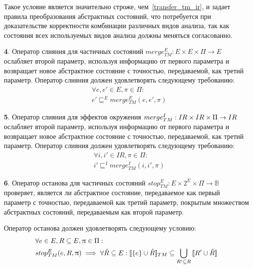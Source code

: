 Такое условие является значительно строже, чем~\ref{transfer_tm_ir}, и задает правила преобразования абстрактных состояний, что потребуется при доказательстве корректности комбинации различных видов анализа, так как состояния всех используемых видов анализа должны меняться согласованно.

{\textbf 4.}
Оператор слияния для частичных состояний $merge^E_{TM}: E \times E \times \Pi \rightarrow E$ ослабляет второй параметр, используя информацию от первого параметра и возвращает новое абстрактное состояние с точностью, передаваемой, как третий параметр.
Оператор слияния должен удовлетворять следующему требованию:
\begin{equation}
\label{cpa_merge_tm_e_eq}
\begin{aligned}
&\forall e, e' \in E, \pi \in \Pi :\\
&e' \sqsubseteq^E merge^E_{TM}(e, e', \pi)
\end{aligned}
\end{equation}

{\textbf 5.}
Оператор слияния для эффектов окружения $merge^I_{TM}: IR \times IR \times \Pi \rightarrow IR$ ослабляет второй параметр, используя информацию от первого параметра и возвращает новое абстрактное состояние с точностью, передаваемой, как третий параметр.
Оператор слияния должен удовлетворять следующему требованию:
\begin{equation}
\label{cpa_merge_tm_i_eq}
\begin{aligned}
&\forall i, i' \in IR, \pi \in \Pi :\\
&i' \sqsubseteq^I merge^I_{TM}(i, i', \pi)
\end{aligned}
\end{equation}

{\textbf 6.} Оператор останова для частичных состояний $stop^E_{TM}: E \times 2^{E} \times \Pi \rightarrow \mathbb{B}$ проверяет, является ли абстрактное состояние, передаваемое как первый параметр с точностью, передаваемой как третий параметр, покрытым множеством абстрактных состояний, передаваемым как второй параметр.

Оператор останова должен удовлетворять следующему условию:
\begin{equation}
\label{cpa_stop_tm_e_eq}
\begin{aligned}
&\forall e \in E, R \subseteq E, \uppi \in \Pi:\\
&stop^E_{TM}(e, R, \uppi) \implies\forall \hat R \subseteq E: [\![ \{e\}\cup \hat R ]\!]_{TM} \subseteq \bigcup_{R'\subseteq R}{[\![ R' \cup \hat R ]\!]}
\end{aligned}
\end{equation}


